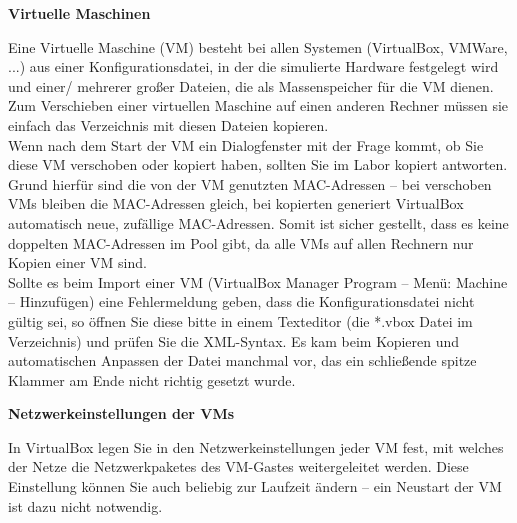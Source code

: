 \documentclass[paper=a4,fontsize=11pt]{scrartcl}%
\numberwithin{equation}{section}
\begin{document}
\begin{center}
\Large{\textbf{Virtuelle Maschinen}}
\end{center}
Eine Virtuelle Maschine (VM) besteht bei allen Systemen (VirtualBox, VMWare, ...) aus einer Konfigurationsdatei, in der die simulierte Hardware festgelegt wird und einer/ mehrerer großer Dateien, die als Massenspeicher für die VM dienen. Zum Verschieben einer virtuellen Maschine auf einen anderen Rechner müssen sie einfach das Verzeichnis mit diesen Dateien kopieren.\\
Wenn nach dem Start der VM ein Dialogfenster mit der Frage kommt, ob Sie diese VM verschoben oder kopiert haben, sollten Sie im Labor kopiert antworten. Grund hierfür sind die von der VM genutzten MAC-Adressen -- bei verschoben VMs bleiben die MAC-Adressen gleich, bei kopierten generiert VirtualBox automatisch neue, zufällige MAC-Adressen. Somit ist sicher gestellt, dass es keine doppelten MAC-Adressen im Pool gibt, da alle VMs auf allen Rechnern nur Kopien einer VM sind.\\
Sollte es beim Import einer VM (VirtualBox Manager Program -- Menü: Machine -- Hinzufügen) eine Fehlermeldung geben, dass die Konfigurationsdatei nicht gültig sei, so öffnen Sie diese bitte in einem
Texteditor (die *.vbox Datei im Verzeichnis) und prüfen Sie die XML-Syntax. Es kam beim Kopieren und automatischen Anpassen der Datei manchmal vor, das ein schließende spitze Klammer am Ende nicht richtig gesetzt wurde.
\begin{center}
\Large{\textbf{Netzwerkeinstellungen der VMs}}
\end{center}
In VirtualBox legen Sie in den Netzwerkeinstellungen jeder VM fest, mit welches der Netze die
Netzwerkpaketes des VM-Gastes weitergeleitet werden. Diese Einstellung können Sie auch beliebig zur
Laufzeit ändern -- ein Neustart der VM ist dazu nicht notwendig.\\
\end{document}
